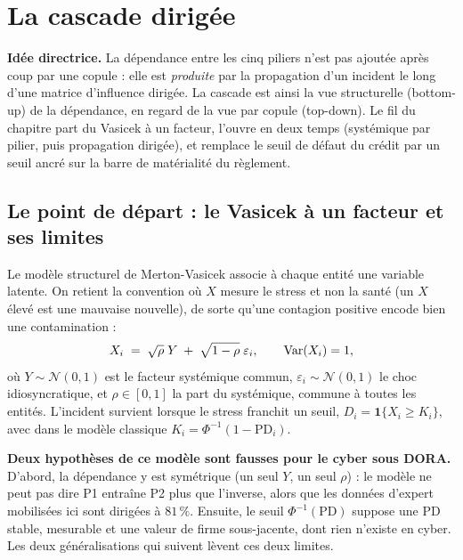 \chapter{La cascade dirigée}
\label{chap:cascade}

\begin{cle}
\textbf{Idée directrice.} La dépendance entre les cinq piliers n'est pas ajoutée après coup par
une copule : elle est \emph{produite} par la propagation d'un incident le long d'une matrice
d'influence dirigée. La cascade est ainsi la vue structurelle (bottom-up) de la
dépendance, en regard de la vue par copule (top-down). Le fil du
chapitre part du Vasicek à un facteur, l'ouvre en deux temps (systémique par pilier, puis
propagation dirigée), et remplace le seuil de défaut du crédit par un seuil ancré sur la barre
de matérialité du règlement.
\end{cle}

\section{Le point de départ : le Vasicek à un facteur et ses limites}

Le modèle structurel de Merton-Vasicek associe à chaque entité une variable latente. On retient
la convention où $X$ mesure le stress et non la santé (un $X$ élevé est une mauvaise
nouvelle), de sorte qu'une contagion positive encode bien une contamination :
\begin{equation}
X_i \;=\; \sqrt{\rho}\;Y \;+\; \sqrt{1-\rho}\;\varepsilon_i, \qquad \mathrm{Var}(X_i)=1,
\end{equation}
où $Y\sim\mathcal N(0,1)$ est le facteur systémique commun, $\varepsilon_i\sim\mathcal N(0,1)$ le
choc idiosyncratique, et $\rho\in[0,1]$ la part du systémique, commune à toutes les entités.
L'incident survient lorsque le stress franchit un seuil, $D_i=\mathbf 1\{X_i\ge K_i\}$, avec dans
le modèle classique $K_i=\Phi^{-1}(1-\mathrm{PD}_i)$.

\begin{attention}
\textbf{Deux hypothèses de ce modèle sont fausses pour le cyber sous DORA.} D'abord, la
dépendance y est symétrique (un seul $Y$, un seul $\rho$) : le modèle ne peut pas dire
\og P1 entraîne P2 plus que l'inverse\fg{}, alors que les données d'expert mobilisées ici
sont dirigées à $81\,\%$. Ensuite, le seuil $\Phi^{-1}(\mathrm{PD})$ suppose une PD stable, mesurable et
une valeur de firme sous-jacente, dont rien n'existe en cyber. Les deux généralisations qui
suivent lèvent ces deux limites.
\end{attention}

